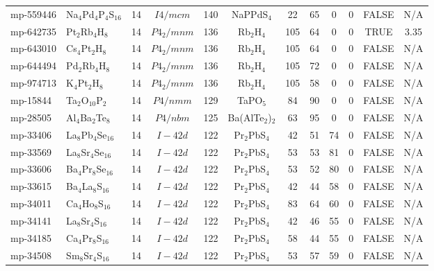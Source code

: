 {\begin{longtable}{llcccccccccc}
    mp-559446 & Na$_{4}$Pd$_{4}$P$_{4}$S$_{16}$ & 14    & $I4/mcm$ & 140   & NaPPdS$_{4}$ & 22    & 65    & 0     & 0     & FALSE & N/A \\
    mp-642735 & Pt$_{2}$Rb$_{4}$H$_{8}$ & 14    & $P4_2/mnm$ & 136   & Rb$_{2}$H$_{4}$ & 105   & 64    & 0     & 0     & TRUE  & 3.35  \\
    mp-643010 & Cs$_{4}$Pt$_{2}$H$_{8}$ & 14    & $P4_2/mnm$ & 136   & Rb$_{2}$H$_{4}$ & 105   & 64    & 0     & 0     & FALSE & N/A \\
    mp-644494 & Pd$_{2}$Rb$_{4}$H$_{8}$ & 14    & $P4_2/mnm$ & 136   & Rb$_{2}$H$_{4}$ & 105   & 72    & 0     & 0     & FALSE & N/A \\
    mp-974713 & K$_{4}$Pt$_{2}$H$_{8}$ & 14    & $P4_2/mnm$ & 136   & Rb$_{2}$H$_{4}$ & 105   & 58    & 0     & 0     & FALSE & N/A \\
    mp-15844 & Ta$_{2}$O$_{10}$P$_{2}$ & 14    & $P4/nmm$ & 129   & TaPO$_{5}$ & 84    & 90    & 0     & 0     & FALSE & N/A \\
    mp-28505 & Al$_{4}$Ba$_{2}$Te$_{8}$ & 14    & $P4/nbm$ & 125   & Ba(AlTe$_{2}$)$_{2}$ & 63    & 95    & 0     & 0     & FALSE & N/A \\
    mp-33406 & La$_{8}$Pb$_{4}$Se$_{16}$ & 14    & $I-42d$ & 122   & Pr$_{2}$PbS$_{4}$ & 42    & 51    & 74    & 0     & FALSE & N/A \\
    mp-33569 & La$_{8}$Sr$_{4}$Se$_{16}$ & 14    & $I-42d$ & 122   & Pr$_{2}$PbS$_{4}$ & 53    & 53    & 81    & 0     & FALSE & N/A \\
    mp-33606 & Ba$_{4}$Pr$_{8}$Se$_{16}$ & 14    & $I-42d$ & 122   & Pr$_{2}$PbS$_{4}$ & 53    & 52    & 80    & 0     & FALSE & N/A \\
    mp-33615 & Ba$_{4}$La$_{8}$S$_{16}$ & 14    & $I-42d$ & 122   & Pr$_{2}$PbS$_{4}$ & 42    & 44    & 58    & 0     & FALSE & N/A \\
    mp-34011 & Ca$_{4}$Ho$_{8}$S$_{16}$ & 14    & $I-42d$ & 122   & Pr$_{2}$PbS$_{4}$ & 83    & 64    & 60    & 0     & FALSE & N/A \\
    mp-34141 & La$_{8}$Sr$_{4}$S$_{16}$ & 14    & $I-42d$ & 122   & Pr$_{2}$PbS$_{4}$ & 42    & 46    & 55    & 0     & FALSE & N/A \\
    mp-34185 & Ca$_{4}$Pr$_{8}$S$_{16}$ & 14    & $I-42d$ & 122   & Pr$_{2}$PbS$_{4}$ & 58    & 44    & 55    & 0     & FALSE & N/A \\
    mp-34508 & Sm$_{8}$Sr$_{4}$S$_{16}$ & 14    & $I-42d$ & 122   & Pr$_{2}$PbS$_{4}$ & 53    & 57    & 59    & 0     & FALSE & N/A \\

\end{longtable}}
